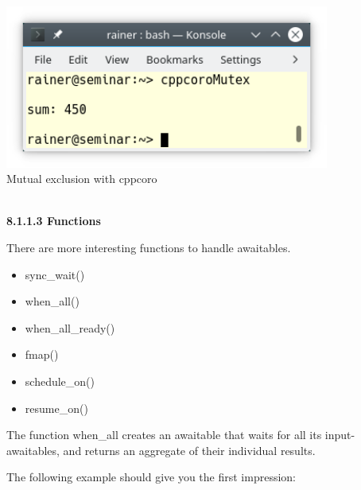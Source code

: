 \begin{center}
\includegraphics[width=0.8\textwidth]{content/5/chapter8/images/4.png}\\
Mutual exclusion with cppcoro
\end{center}

\hspace*{\fill} \\ %
\noindent
\textbf{8.1.1.3\hspace{0.2cm} Functions}

There are more interesting functions to handle awaitables.

\begin{itemize}
\item 
sync\_wait()

\item 
when\_all()

\item 
when\_all\_ready()

\item 
fmap()

\item 
schedule\_on()

\item 
resume\_on()
\end{itemize}

The function when\_all creates an awaitable that waits for all its input-awaitables, and returns an aggregate of their individual results.

The following example should give you the first impression:

